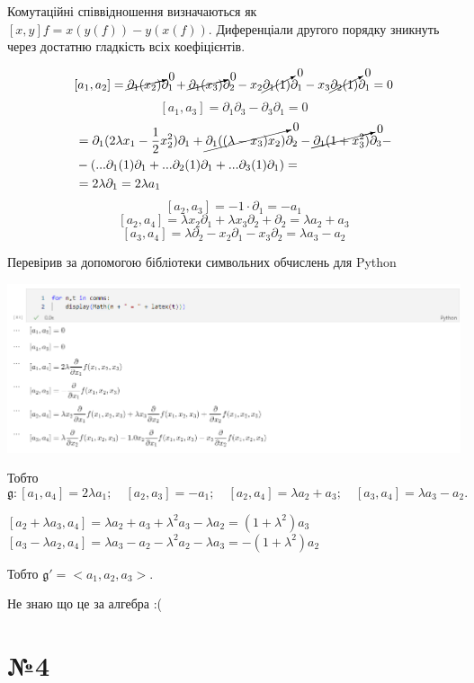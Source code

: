 \documentclass[10pt, a4paper]{article} %
\newcommand{\g}{\mathfrak{g}}
\begin{document}
Комутаційні співвідношення визначаються як $[x,y]f = x(y(f)) - y(x(f))$.
Диференціали другого порядку зникнуть через достатню гладкість всіх коефіцієнтів. 

\[ [a_1, a_2] = \cancelto{0}{\partial_1(x_2)}\partial_1+\cancelto{0}{\partial_1(x_3)}\partial_2 - x_2\cancelto{0}{\partial_1(1)}\partial_1 - x_3\cancelto{0}{\partial_2(1)}\partial_1 = 0\]
\[ [a_1, a_3] = \partial_1\partial_3 - \partial_3\partial_1 = 0\]
\begin{align*}
    [a_1, a_4] &= \partial_1(2\lambda x_1 - \frac{1}{2}x_2^2)\partial_1 + \cancelto{0}{\partial_1((\lambda-x_3)x_2)}\partial_2 - \cancelto{0}{\partial_1(1+x_3^2)}\partial_3 - \\
    &- \left(...\partial_1(1)\partial_1 + ...\partial_2(1)\partial_1 + ...\partial_3(1)\partial_1\right) = \\
    &= 2\lambda\partial_1 = 2 \lambda a_1
\end{align*}
\[ [a_2, a_3] = -1 \cdot \partial_1 = -a_1\]
\[ [a_2, a_4] = \lambda x_{2} \partial_1 + \lambda x_{3} \partial_2 + \partial_{2} = \lambda a_2 + a_3\]
\[ [a_3, a_4] = \lambda \partial_2 - x_{2} \partial_1 - x_{3} \partial_2 = \lambda a_3 - a_2 \]

Перевірив за допомогою бібліотеки символьних обчислень для Python

\includegraphics[width=\textwidth]{1.png}

Тобто 
\[\g : [a_1, a_4] = 2\lambda a_1; \quad [a_2, a_3] = -a_1; \quad [a_2, a_4] = \lambda a_2 + a_3; \quad [a_3, a_4] = \lambda a_3 - a_2. \]

$[a_2+\lambda a_3,a_4] = \lambda a_2 + a_3 + \lambda^2 a_3 - \lambda a_2 = (1+\lambda^2) a_3$\\
$[a_3-\lambda a_2, a_4] = \lambda a_3 - a_2 - \lambda^2 a_2 - \lambda a_3 = -(1+\lambda^2) a_2$

Тобто $\g' = <a_1, a_2, a_3>$.

Не знаю що це за алгебра :(

\section*{№4}
\end{document}
